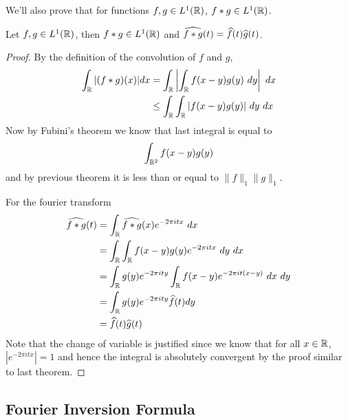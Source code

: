   We'll also prove that for functions $f, g \in L^1(\mathbb R)$, $f*g \in L^1(\mathbb R)$.
  \begin{proposition}
    \label{prop:convolution_is_well_defined_in_L^1(R)}
    Let $f, g \in L^1(\mathbb R)$, then $f*g \in L^1(\mathbb R)$ and $\widehat{f*g}(t) = \widehat{f}(t)\widehat{g}(t)$.
  \end{proposition}
  \begin{proof}
    By the definition of the convolution of $f$ and $g$, 
    \begin{align*}
      \int_\mathbb R|(f*g)(x)| dx &= \int_\mathbb R \left| \int_\mathbb R f(x-y)g(y) \ dy \right| \ dx \\
      & \le \int_\mathbb R \int_\mathbb R |f(x-y)g(y)| \ dy \ dx
    \end{align*}
    Now by Fubini's theorem we know that last integral is equal to $$\int_{\mathbb R^2}f(x-y)g(y) $$ and by previous theorem it is less than or equal to $\|f\|_1\|g\|_1$.

    For the fourier transform
    \begin{align*}
      \widehat{f*g}(t) &= \int_\R \widehat{f*g}(x) e^{-2 \pi itx} \ dx \\
      &= \int_\R \int_\R f(x-y)g(y) e^{-2 \pi itx} \ dy \ dx \\
      &= \int_\R g(y)e^{-2 \pi ity}\int_\R f(x-y) e^{-2 \pi it (x-y)} \ dx \ dy \\
      &= \int_\R g(y)e^{-2 \pi ity} \hatf(t) dy \\
      &= \hatf(t) \hatg(t) \\
    \end{align*}
    Note that the change of variable is justified since we know that  for all $x \in \mathbb R$, $|e^{-2\pi itx}| = 1$ and hence the integral is absolutely convergent by the proof similar to last theorem. 
  \end{proof}


\subsection{Fourier Inversion Formula}

